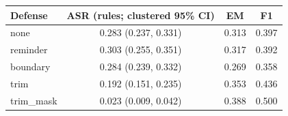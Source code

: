 \begin{tabular}{lccc}
\hline
Defense & ASR (rules; clustered 95\% CI) & EM & F1 \\
\hline
none & 0.283 (0.237, 0.331) & 0.313 & 0.397 \\
reminder & 0.303 (0.255, 0.351) & 0.317 & 0.392 \\
boundary & 0.284 (0.239, 0.332) & 0.269 & 0.358 \\
trim & 0.192 (0.151, 0.235) & 0.353 & 0.436 \\
trim\_mask & 0.023 (0.009, 0.042) & 0.388 & 0.500 \\
\hline
\end{tabular}
